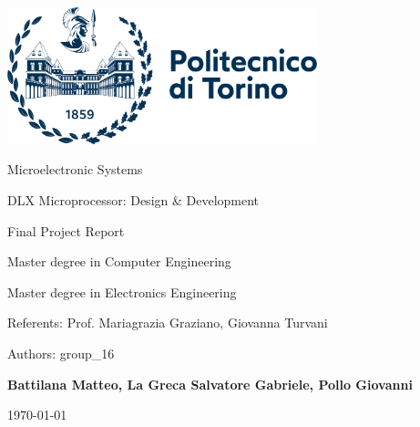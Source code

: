 \documentclass[10pt,  english, makeidx, a4paper, titlepage, oneside]{book}
\begin{document}
\frontmatter
\begin{titlepage}
\vspace{0cm}
\centerline{
\includegraphics[width=9cm]{./logopoli}} 
\vspace{0.5cm}
\vspace{2.5cm}
\centerline{\huge\sf Microelectronic Systems}
\vspace{1cm}
\centerline{\Huge\sf DLX Microprocessor: Design \& Development}
\bigskip
\centerline{\huge\sf Final Project Report}
\vspace{1cm}
\centerline{\Large Master degree in Computer Engineering}
\bigskip
\centerline{\Large Master degree in Electronics Engineering}
\vspace{4.5cm}
%
\centerline{\large Referents: Prof. Mariagrazia Graziano, Giovanna Turvani}
\bigskip
\vspace{1cm}
\centerline{\large Authors: group\_16}
\bigskip
\centerline{\large \textbf{Battilana Matteo, La Greca Salvatore Gabriele, Pollo Giovanni}}
%
\vspace{2cm}
\centerline{\large \today}
\end{titlepage}


\shipout\null



\tableofcontents
\lstlistoflistings

\mainmatter













\appendix
% 
%
\end{document}

